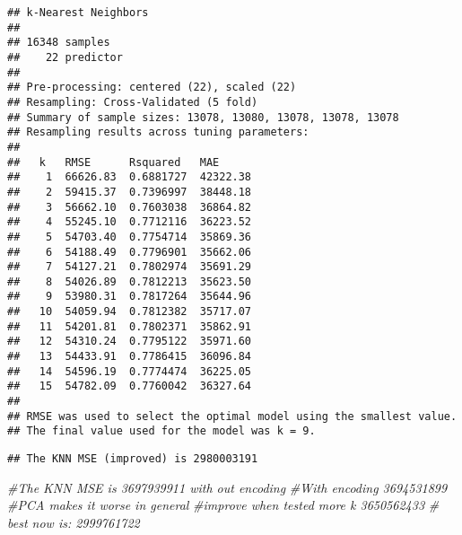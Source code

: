 \documentclass[
]{article}
\newenvironment{Shaded}{\begin{snugshade}}{\end{snugshade}}
\newcommand{\AttributeTok}[1]{\textcolor[rgb]{0.13,0.29,0.53}{#1}}
\newcommand{\CommentTok}[1]{\textcolor[rgb]{0.56,0.35,0.01}{\textit{#1}}}
\newcommand{\DecValTok}[1]{\textcolor[rgb]{0.00,0.00,0.81}{#1}}
\newcommand{\FunctionTok}[1]{\textcolor[rgb]{0.13,0.29,0.53}{\textbf{#1}}}
\newcommand{\NormalTok}[1]{#1}
\newcommand{\OtherTok}[1]{\textcolor[rgb]{0.56,0.35,0.01}{#1}}
\newcommand{\SpecialCharTok}[1]{\textcolor[rgb]{0.81,0.36,0.00}{\textbf{#1}}}
\newcommand{\StringTok}[1]{\textcolor[rgb]{0.31,0.60,0.02}{#1}}
\begin{document}
\begin{verbatim}
## k-Nearest Neighbors 
## 
## 16348 samples
##    22 predictor
## 
## Pre-processing: centered (22), scaled (22) 
## Resampling: Cross-Validated (5 fold) 
## Summary of sample sizes: 13078, 13080, 13078, 13078, 13078 
## Resampling results across tuning parameters:
## 
##   k   RMSE      Rsquared   MAE     
##    1  66626.83  0.6881727  42322.38
##    2  59415.37  0.7396997  38448.18
##    3  56662.10  0.7603038  36864.82
##    4  55245.10  0.7712116  36223.52
##    5  54703.40  0.7754714  35869.36
##    6  54188.49  0.7796901  35662.06
##    7  54127.21  0.7802974  35691.29
##    8  54026.89  0.7812213  35623.50
##    9  53980.31  0.7817264  35644.96
##   10  54059.94  0.7812382  35717.07
##   11  54201.81  0.7802371  35862.91
##   12  54310.24  0.7795122  35971.60
##   13  54433.91  0.7786415  36096.84
##   14  54596.19  0.7774474  36225.05
##   15  54782.09  0.7760042  36327.64
## 
## RMSE was used to select the optimal model using the smallest value.
## The final value used for the model was k = 9.
\end{verbatim}

\begin{Shaded}
\end{Shaded}

\begin{verbatim}
## The KNN MSE (improved) is 2980003191
\end{verbatim}

\begin{Shaded}
\begin{Highlighting}[]
\CommentTok{\#The KNN MSE is 3697939911 with out encoding}
\CommentTok{\#With encoding  3694531899}
\CommentTok{\#PCA makes it worse in general}
\CommentTok{\#improve when tested more k 3650562433}
\CommentTok{\# best now is: 2999761722 }
\end{Highlighting}
\end{Shaded}
\end{document}

